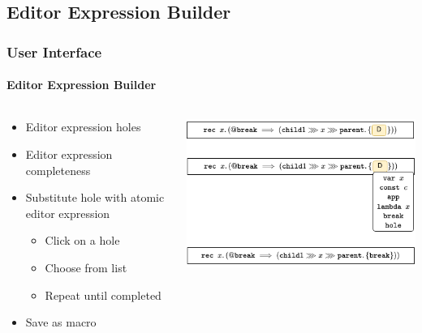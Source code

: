 \documentclass{beamer}
\begin{document}
\subsection{Editor Expression Builder}

\begin{frame}
    \frametitle{User Interface}
    \framesubtitle{Editor Expression Builder}

    \begin{columns}
        \begin{column}{0.5\textwidth}
            \begin{itemize}
                \item Editor expression holes
                    \pause
                \item Editor expression completeness
                    \pause
                \item Substitute hole with atomic editor expression
                \begin{itemize}
                    \item Click on a hole
                    \item Choose from list
                    \item Repeat until completed
                \end{itemize}
                \pause
                \item Save as macro
            \end{itemize}
        \end{column}

        \begin{column}{0.5\textwidth}
            \includegraphics[width=\textwidth]{../assets/exp-builder.png}
        \end{column}
    \end{columns}
\end{frame}
\end{document}
